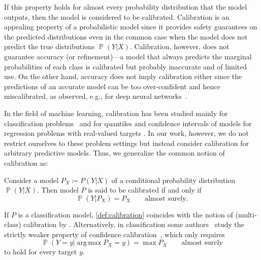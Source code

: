 \documentclass{article}
\DeclareMathOperator{\Prob}{\mathbb{P}}
\DeclareMathOperator{\argmax}{arg\,max}
\begin{document}
If this property holds for almost every probability distribution that
the model outputs, then the model is considered to be calibrated.
Calibration is an appealing property of a probabilistic model since it provides
safety guarantees on the predicted distributions even in the common case
when the model does not predict the true distributions $\Prob(Y | X)$.
Calibration, however, does not guarantee accuracy (or refinement)---a model
that always predicts the marginal probabilities of each class
is calibrated but probably inaccurate and of limited use. On the other
hand, accuracy does not imply calibration either since the predictions
of an accurate model can be too over-confident and hence miscalibrated,
as observed, e.g., for deep neural networks~\citep{Guo2017}.

In the field of machine learning, calibration has been
studied mainly for classification problems~\citep{Guo2017,Widmann2019,Vaicenavicius2019,Platt2000,Zadrozny2002,Broecker2009,Kull2017,Kumar2018,Kull2019}
and for quantiles and confidence intervals of models for regression problems
with real-valued targets \citep{Ho2005,Fasiolo2020,Rueda2006,Taillardat2016,Kuleshov2018}.
In our work, however, we do not restrict ourselves to these problem
settings but instead consider calibration for arbitrary predictive
models.
Thus, we generalize the common notion of calibration as:

\begin{definition}\label{def:calibration}
    Consider a model $P_X \coloneqq P(Y|X)$ of a conditional probability distribution
    $\Prob(Y|X)$. Then model $P$ is said to be calibrated
    if and only if
    \begin{equation}\label{eq:calibration_definition}
        \Prob(Y|P_X) = P_X \qquad \text{almost surely}.
    \end{equation}
\end{definition}

If $P$ is a classification model, \cref{def:calibration} coincides
with the notion of (multi-class) calibration by
\citet{Broecker2009,Vaicenavicius2019,Kull2019}. Alternatively, in classification
some authors~\citep{Naeini2015,Guo2017,Kumar2018} study the
strictly weaker property of confidence calibration~\citep{Kull2019},
which only requires
\begin{equation}\label{eq:calibration_confidence}
    \Prob{(Y = y | \argmax {P_X} = y)} = \max P_X \qquad \text{almost surely}
\end{equation}
to hold for every target $y$.
\end{document}
